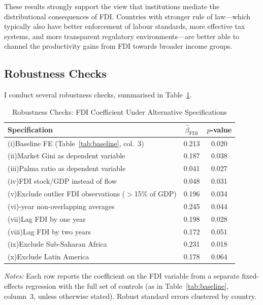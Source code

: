 \documentclass[12pt,a4paper]{article}
\begin{document}
These results strongly support the view that institutions mediate the distributional consequences of FDI.  Countries with stronger rule of law---which typically also have better enforcement of labour standards, more effective tax systems, and more transparent regulatory environments---are better able to channel the productivity gains from FDI towards broader income groups.

\subsection{Robustness Checks}

I conduct several robustness checks, summarised in Table~\ref{tab:robust}.

\begin{table}[H]
\centering
\caption{Robustness Checks: FDI Coefficient Under Alternative Specifications}
\label{tab:robust}
\begin{threeparttable}
\begin{tabular}{@{} l cc @{}}
\toprule
Specification & $\hat{\beta}_{\text{FDI}}$ & $p$-value \\
\midrule
(i)\quad Baseline FE (Table~\ref{tab:baseline}, col.~3)          & 0.213 & 0.020 \\
(ii)\quad Market Gini as dependent variable                       & 0.187 & 0.038 \\
(iii)\quad Palma ratio as dependent variable                      & 0.041 & 0.027 \\
(iv)\quad FDI stock/GDP instead of flow                           & 0.048 & 0.031 \\
(v)\quad Exclude outlier FDI observations ($>$15\% of GDP)        & 0.196 & 0.034 \\
(vi)\quad 5-year non-overlapping averages                         & 0.245 & 0.044 \\
(vii)\quad Lag FDI by one year                                    & 0.198 & 0.028 \\
(viii)\quad Lag FDI by two years                                   & 0.172 & 0.051 \\
(ix)\quad Exclude Sub-Saharan Africa                              & 0.231 & 0.018 \\
(x)\quad Exclude Latin America                                    & 0.178 & 0.064 \\
\bottomrule
\end{tabular}
\begin{tablenotes}[flushleft]\footnotesize
\item \textit{Notes:} Each row reports the coefficient on the FDI variable from a separate fixed-effects regression with the full set of controls (as in Table~\ref{tab:baseline}, column~3, unless otherwise stated).  Robust standard errors clustered by country.
\end{tablenotes}
\end{threeparttable}
\end{table}
\end{document}

